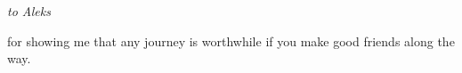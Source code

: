 \thispagestyle{empty}
{}

\vspace*{3cm}

\begin{center}
  \emph{to Aleks} \\\medskip

  for showing me that any journey is worthwhile if you make good friends along the way.
\end{center}
